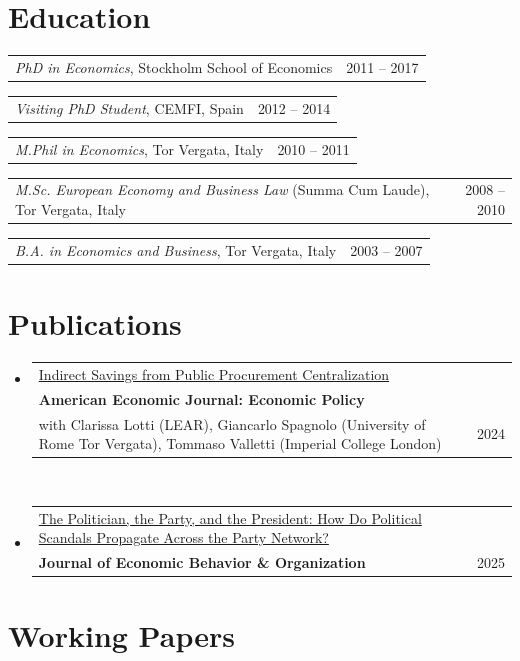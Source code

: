 \documentclass[10pt, a4paper]{article}
\makeatletter
\newcommand{\sans}{\fontfamily{phv}\selectfont}
\newcommand{\cvyear}[1]{%
  {\sans\fontsize{7.5}{9}\selectfont\color{inkfaint}#1}%
}
\newcommand{\cventry}[2]{%
  \noindent
  \begin{tabularx}{\textwidth}{@{}X@{\hspace{1em}}r@{}}
    #1 & \cvyear{#2}
  \end{tabularx}\vspace{1pt}%
}
\makeatother
\begin{document}
\section{Education}

\cventry{\textit{PhD in Economics}, Stockholm School of Economics}{2011 – 2017}
\cventry{\textit{Visiting PhD Student}, CEMFI, Spain}{2012 – 2014}
\cventry{\textit{M.Phil in Economics}, Tor Vergata, Italy}{2010 – 2011}
\cventry{\textit{M.Sc. European Economy and Business Law} (Summa Cum Laude), Tor Vergata, Italy}{2008 – 2010}
\cventry{\textit{B.A. in Economics and Business}, Tor Vergata, Italy}{2003 – 2007}

\section{Publications }

\begin{itemize}



\item \cventry{%
  \href{https://osf.io/c678u/}{Indirect Savings from Public Procurement Centralization}\\[-2pt]
  {\small\color{inklight}\textbf{American Economic Journal: Economic Policy} } \\[-2pt]
  {\small\color{inklight} with Clarissa Lotti (LEAR), Giancarlo Spagnolo (University of Rome Tor Vergata), Tommaso Valletti (Imperial College London)}
}{2024}\\

\item \cventry{%

  \href{https://www.sciencedirect.com/science/article/pii/S0167268125000174}{The Politician, the Party, and the President: How Do Political Scandals Propagate Across the Party Network?}\\[-2pt]
  {\small\color{inklight}\textbf{Journal of Economic Behavior \& Organization}}
}{2025}



\end{itemize}


\section{ Working Papers}
\end{document}
